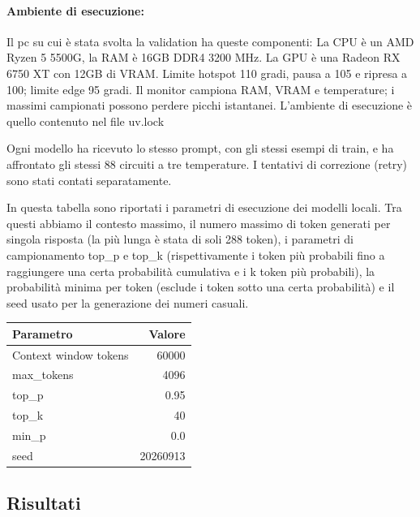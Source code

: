 \paragraph{Ambiente di esecuzione:}
Il pc su cui è stata svolta la validation ha queste componenti:
La CPU è un AMD Ryzen 5 5500G, la RAM è 16GB DDR4 3200 MHz.
La GPU è una Radeon RX 6750 XT con 12GB di VRAM. Limite hotspot 110 gradi, pausa a 105 e ripresa a 100; limite edge 95 gradi. Il monitor campiona RAM, VRAM e temperature; i massimi campionati possono perdere picchi istantanei.
L'ambiente di esecuzione è quello contenuto nel file uv.lock

Ogni modello ha ricevuto lo stesso prompt, con gli stessi esempi di train, e ha affrontato gli stessi 88 circuiti a tre temperature. I tentativi di correzione (retry) sono stati contati separatamente.

In questa tabella sono riportati i parametri di esecuzione dei modelli locali. Tra questi abbiamo il contesto massimo, il numero massimo di token generati per singola risposta (la più lunga è stata di soli 288 token), i parametri di campionamento top\_p e top\_k (rispettivamente i token più probabili fino a raggiungere una certa probabilità cumulativa e i k token più probabili), la probabilità minima per token (esclude i token sotto una certa probabilità) e il seed usato per la generazione dei numeri casuali.
\begin{center}\begin{tabular}{lr}\toprule Parametro & Valore\\\midrule
Context window tokens & 60000\\

max\_tokens & 4096\\

top\_p & 0.95\\

top\_k & 40\\

min\_p & 0.0\\

seed & 20260913\\

\bottomrule\end{tabular}\end{center}

\subsection{Risultati}

